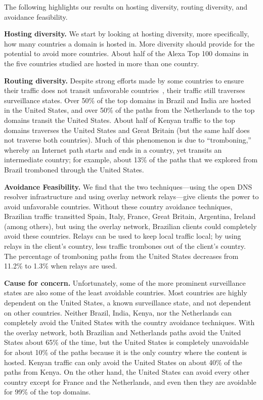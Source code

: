 The following highlights our results on hosting diversity, routing diversity, and avoidance feasibility.

{\bf Hosting diversity.} We start by looking at hosting diversity, more specifically, how many
countries a domain is hosted in.  More diversity should provide for the
potential to avoid more countries.  About half of the
Alexa Top 100 domains in the five countries studied are hosted in more
than one country. 

{\bf Routing diversity.} Despite strong efforts made by some countries to ensure their traffic does 
not transit unfavorable countries~\cite{brazil_history, brazil_break_from_US, brazil_conference,
  brazil_conference2, brazil_human_rights},
their traffic still traverses surveillance states.  Over 50\% of the top domains in
Brazil and India are hosted in the United States, and over 50\% of the
paths from the Netherlands to the top domains transit the
United States.  About half of Kenyan traffic to the top domains traverses the United States
and Great Britain (but the same half does not traverse both countries).  Much of this phenomenon is
due to ``tromboning,'' whereby an Internet path starts and ends in a
country, yet transits an intermediate country; for example, about 13\%
of the paths that we explored from Brazil tromboned through the United States. 

{\bf Avoidance Feasibility.} We find that the two techniques---using the open DNS resolver 
infrastructure and using overlay network relays---give clients the power to avoid unfavorable countries.  Without these
country avoidance techniques, Brazilian traffic transitted Spain, Italy,
France, Great Britain, Argentina, Ireland (among others), but using the
overlay network, Brazilian clients could completely avoid these
countries.  Relays can be used to
keep local traffic local; by using relays in the client's country, less
traffic trombones out of the client's country.  The percentage of tromboning paths
from the United States decreases from 11.2\% to 1.3\% when
relays are used.   

{\bf Cause for concern.} Unfortunately, some of the more prominent surveillance states are also
some of the least avoidable countries.  Most countries are
highly dependent on the United States, a known surveillance state, and
not dependent on other countries.  Neither Brazil, India, Kenya, nor the
Netherlands can completely avoid the United States with the country
avoidance techniques.  With the overlay network, both Brazilian and
Netherlands paths avoid the United States about 65\% of the time, but
the United States is completely unavoidable for about 10\% of the paths
because it is the only country where the content is hosted.  Kenyan traffic can
only avoid the United States on about 40\% of the paths from Kenya.  On the other hand, the United States can avoid
every other country except for France and the Netherlands, and even then
they are avoidable for 99\% of the top domains. 

